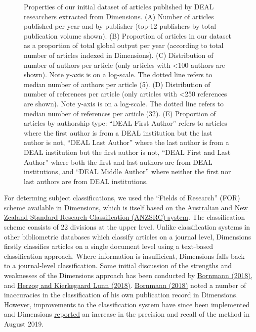 \documentclass[
]{article}
\begin{document}
\begin{figure}
\caption{Properties of our initial dataset of articles published by DEAL researchers extracted from Dimensions. (A) Number of articles published per year and by publisher (top-12 publishers by total publication volume shown). (B) Proportion of articles in our dataset as a proportion of total global output per year (according to total number of articles indexed in Dimensions). (C) Distribution of number of authors per article (only articles with \textless100 authors are shown). Note y-axis is on a log-scale. The dotted line refers to median number of authors per article (5). (D) Distribution of number of references per article (only articles with \textless250 references are shown). Note y-axis is on a log-scale. The dotted line refers to median number of references per article (32). (E) Proportion of articles by authorship type: ``DEAL First Author'' refers to articles where the first author is from a DEAL institution but the last author is not, ``DEAL Last Author'' where the last author is from a DEAL institution but the first author is not, ``DEAL First and Last Author'' where both the first and last authors are from DEAL institutions, and ``DEAL Middle Author'' where neither the first nor last authors are from DEAL institutions.}\label{fig:items-overview}
\end{figure}

For determing subject classifications, we used the ``Fields of Research'' (FOR) scheme available in Dimensions, which is itself based on the \href{https://dimensions.freshdesk.com/support/solutions/articles/23000018826-what-is-the-background-behind-the-fields-of-research-for-classification-system-}{Australian and New Zealand Standard Research Classification (ANZSRC) system}. The classification scheme consists of 22 divisions at the upper level. Unlike classification systems in other bibliometric databases which classify articles on a journal level, Dimensions firstly classifies articles on a single document level using a text-based classification approach. Where information is insufficient, Dimensions falls back to a journal-level classification. Some initial discussion of the strengths and weaknesses of the Dimensions approach has been conducted by \href{https://doi.org/10.1007/s11192-018-2855-y}{Bornmann (2018)}, and \href{https://doi.org/10.1007/s11192-018-2854-z}{Herzog and Kierkegaard Lunn (2018)}. \href{https://doi.org/10.1007/s11192-018-2855-y}{Bornmann (2018)} noted a number of inaccuracies in the classification of his own publication record in Dimensions. However, improvements to the classification system have since been implemented and Dimensions \href{https://www.dimensions.ai/release-notes/}{reported} an increase in the precision and recall of the method in August 2019.
\end{document}
